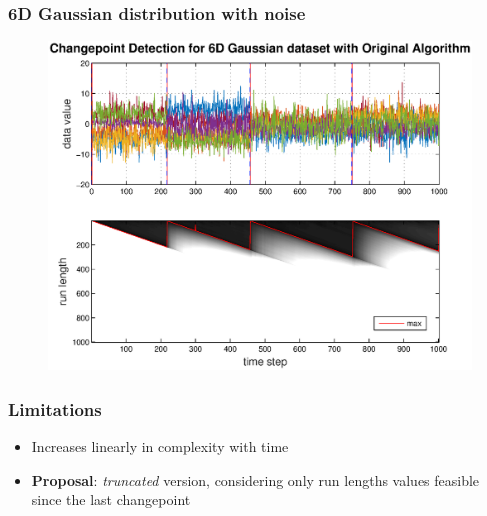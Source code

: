 \documentclass{beamer} %
\begin{document}
\begin{frame}
\frametitle{6D Gaussian distribution with noise}
\begin{figure}
\centering
  \includegraphics[height=.85\textheight]{6d_gauss_full.eps}
\end{figure}
\end{frame}


\begin{frame}
\frametitle{Limitations}
\begin{itemize}
\item Increases linearly in complexity with time
\vspace{1cm}
\item \textbf{Proposal}: \textit{truncated} version, considering only run lengths values feasible since the last changepoint
\end{itemize}
\end{frame}
\end{document}
